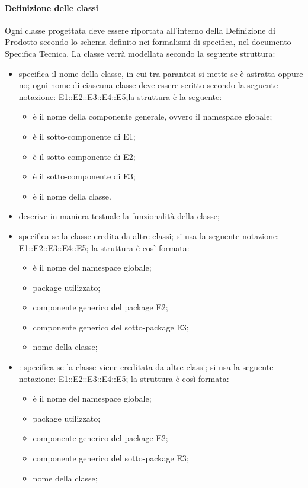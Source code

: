 \paragraph{Definizione delle classi \\}
\label{}
Ogni classe progettata deve essere riportata all'interno della Definizione di Prodotto secondo lo schema definito nei formalismi di specifica, nel documento Specifica Tecnica. La classe verrà modellata secondo la seguente struttura:
\begin{itemize}
\item {}specifica il nome della classe, in cui tra parantesi si mette se è astratta oppure no; ogni nome di ciascuna classe deve essere scritto secondo la seguente notazione: E1::E2::E3::E4::E5;la struttura è la seguente: 
\begin{itemize}
\item {}è il nome della componente generale, ovvero il namespace globale;
\item {}è il sotto-componente di E1;
\item {}è il sotto-componente di E2;
\item {}è il sotto-componente di E3; 
\item {}è il nome della classe.
\end{itemize}
\item {}descrive in maniera testuale la funzionalità della classe;
\item {}specifica se la classe eredita da altre classi; si usa la seguente notazione: E1::E2::E3::E4::E5; la struttura è così formata:
	\begin{itemize}
	\item {}è il nome del namespace globale;
	\item {}package utilizzato;
	\item {}componente generico del package E2;
	\item {}componente generico del sotto-package E3;
	\item {}nome della classe;
	\end{itemize}
\item {}: specifica se la classe viene ereditata da altre classi; si usa la seguente notazione: E1::E2::E3::E4::E5; la struttura è così formata:
	\begin{itemize}
	\item {}è il nome del namespace globale;
	\item {}package utilizzato;
	\item {}componente generico del package E2;
	\item {}componente generico del sotto-package E3;
	\item {}nome della classe;
	\end{itemize}
\end{itemize}

